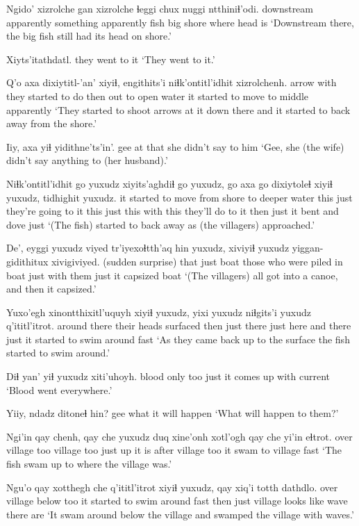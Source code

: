 \documentclass[12pt]{article}
\begin{document}
\gll Ngido' xizrolche gan xizrolche ɬeggi chux nuggi ntthiniɬ'odi.
{downstream} apparently something apparently fish big shore {where head is}
\glt `Downstream there, the big fish still had its head on shore.'
\glend

\gll Xiyts'itathdatl.
{{they went to it}}
\glt `They went to it.'
\glend

\gll Q'o axa dixiytitl-'an' xiyiɬ, engithits'i niɬk'ontitl'idhit xizrolchenh.
arrow with {they started to do} then {out to open water} {it started to move to middle} apparently
\glt `They started to shoot arrows at it down there and it started to back away from the shore.'
\glend

\gll Iiy, {axa yiɬ} yidithne'ts'in'.
gee {at that} {she didn't say to him}
\glt `Gee, she (the wife) didn't say anything to (her husband).'
\glend

\gll Niɬk'ontitl'idhit go yuxudz xiyits'aghdiɬ go yuxudz, go axa go dixiytoleɬ xiyiɬ yuxudz, tidhighit yuxudz. 
{it started to move from shore to deeper water} this just {they're going to it} this just this with this {they'll do to it} then just {it bent and dove} just
\glt `(The fish) started to back away as (the villagers) approached.'
\glend

\gll De', eyggi yuxudz viyed {tr'iyexoɬtth'aq hin} yuxudz, xiviyiɬ yuxudz yiggan-gidithitux xivigiviyed.
{(sudden surprise)} that just boat {those who were piled in boat} just {with them} just {it capsized} boat
\glt `(The villagers) all got into a canoe, and then it capsized.'
\glend

\gll Yuxo'egh {xinontthixitl'uquyh} xiyiɬ yuxudz, yixi yuxudz niɬgits'i yuxudz q'ititl'itrot.
{around there} {their heads surfaced} then just there just {here and there} just {it started to swim around fast}
\glt `As they came back up to the surface the fish started to swim around.'
\glend

\gll Diɬ yan' yiɬ yuxudz xiti'uhoyh.
blood only too just {it comes up with current}
\glt `Blood went everywhere.'
\glend

\gll Yiiy, ndadz {ditoneɬ hin}?
gee what {it will happen}
\glt `What will happen to them?'
\glend

\gll Ngi'in qay chenh, qay che yuxudz duq xine'onh xotl'ogh qay che {yi'in eɬtrot.}
over village too village too just up {it is} after village too {it swam to village fast}
\glt `The fish swam up to where the village was.'
\glend

\gll Ngu'o qay xotthegh che q'ititl'itrot xiyiɬ yuxudz, qay xiq'i totth dathdlo.
over village below too {it started to swim around fast} then just village {looks like} wave {there are}
\glt `It swam around below the village and swamped the village with waves.'
\glend
\end{document}
